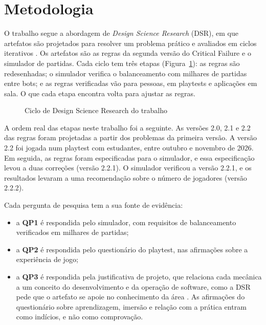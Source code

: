 \section{Metodologia}
\label{sec:metodologia}

O trabalho segue a abordagem de \emph{Design Science Research} (DSR), em que artefatos são projetados para
resolver um problema prático e avaliados em ciclos iterativos \cite{hevner2004,wieringa2014}. Os artefatos são as
regras da segunda versão do Critical Failure e o simulador de partidas. Cada ciclo tem três etapas
(Figura~\ref{fig:ciclo}): as regras são redesenhadas; o simulador verifica o balanceamento com milhares de
partidas entre bots; e as regras verificadas vão para pessoas, em playtests e aplicações em sala. O que cada
etapa encontra volta para ajustar as regras.

\begin{figure}[ht]
  \centering
  
  \caption{Ciclo de Design Science Research do trabalho}
  \label{fig:ciclo}
\end{figure}

A ordem real das etapas neste trabalho foi a seguinte. As versões 2.0, 2.1 e 2.2 das regras foram projetadas a
partir dos problemas da primeira versão. A versão 2.2 foi jogada num playtest com estudantes, entre outubro e
novembro de 2026. Em seguida, as regras foram especificadas para o simulador, e essa especificação levou a duas
correções (versão 2.2.1). O simulador verificou a versão 2.2.1, e os resultados levaram a uma recomendação sobre o
número de jogadores (versão 2.2.2).


Cada pergunta de pesquisa tem a sua fonte de evidência:
\begin{itemize}
  \item a \textbf{QP1} é respondida pelo simulador, com requisitos de balanceamento verificados em milhares de
    partidas;
  \item a \textbf{QP2} é respondida pelo questionário do playtest, nas afirmações sobre a experiência de jogo;
  \item a \textbf{QP3} é respondida pela justificativa de projeto, que relaciona cada mecânica a um conceito do
    desenvolvimento e da operação de software, como a DSR pede que o artefato se apoie no conhecimento da área
    \cite{hevner2004}. As afirmações do questionário sobre aprendizagem, imersão e relação com a prática entram
    como indícios, e não como comprovação.
\end{itemize}

